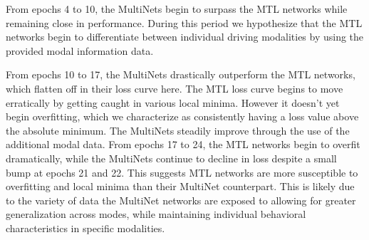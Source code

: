 From epochs 4 to 10, the MultiNets begin to surpass the MTL networks while remaining close in performance. During this period we hypothesize that the MTL networks begin to differentiate between individual driving modalities by using the provided modal information data.

From epochs 10 to 17, the MultiNets drastically outperform the MTL networks, which flatten off in their loss curve here. The MTL loss curve begins to move erratically by getting caught in various local minima. However it doesn't yet begin overfitting, which we characterize as consistently having a loss value above the absolute minimum. The MultiNets steadily improve through the use of the additional modal data. From epochs 17 to 24, the MTL networks begin to overfit dramatically, while the MultiNets continue to decline in loss despite a small bump at epochs 21 and 22. This suggests MTL networks are more susceptible to overfitting and local minima than their MultiNet counterpart. This is likely due to the variety of data the MultiNet networks are exposed to allowing for greater generalization across modes, while maintaining individual behavioral characteristics in specific modalities.

